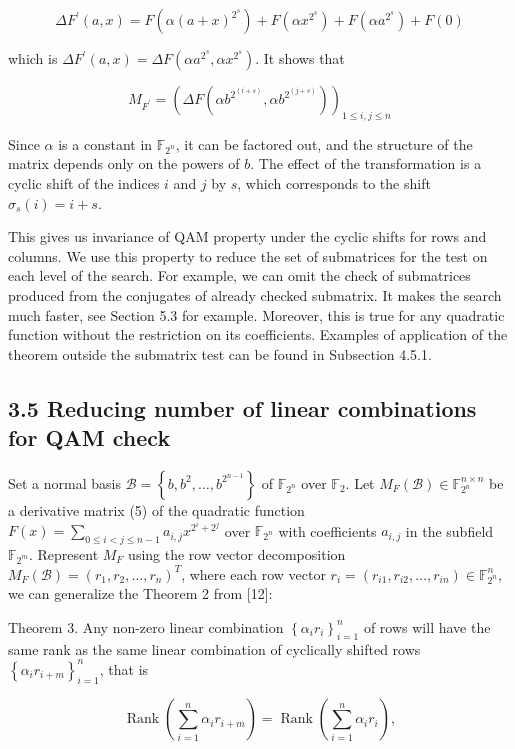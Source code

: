 \documentclass[10pt]{article}
\begin{document}
$$
\Delta F^{\prime}(a, x)=F\left(\alpha(a+x)^{2^{s}}\right)+F\left(\alpha x^{2^{s}}\right)+F\left(\alpha a^{2^{s}}\right)+F(0)
$$

which is $\Delta F^{\prime}(a, x)=\Delta F\left(\alpha a^{2^{s}}, \alpha x^{2^{s}}\right)$. It shows that

$$
M_{F^{\prime}}=\left(\Delta F\left(\alpha b^{2^{(i+s)}}, \alpha b^{2^{(j+s)}}\right)\right)_{1 \leq i, j \leq n}
$$

Since $\alpha$ is a constant in $\mathbb{F}_{2^{n}}$, it can be factored out, and the structure of the matrix depends only on the powers of $b$. The effect of the transformation is a cyclic shift of the indices $i$ and $j$ by $s$, which corresponds to the shift $\sigma_{s}(i)=i+s$.

This gives us invariance of QAM property under the cyclic shifts for rows and columns. We use this property to reduce the set of submatrices for the test on each level of the search. For example, we can omit the check of submatrices produced from the conjugates of already checked submatrix. It makes the search much faster, see Section 5.3 for example. Moreover, this is true for any quadratic function without the restriction on its coefficients. Examples of application of the theorem outside the submatrix test can be found in Subsection 4.5.1.

\subsection*{3.5 Reducing number of linear combinations for QAM check}
Set a normal basis $\mathcal{B}=\left\{b, b^{2}, \ldots, b^{2^{n-1}}\right\}$ of $\mathbb{F}_{2^{n}}$ over $\mathbb{F}_{2}$. Let $M_{F}(\mathcal{B}) \in \mathbb{F}_{2^{n}}^{n \times n}$ be a derivative matrix (5) of the quadratic function $F(x)=\sum_{0 \leq i<j \leq n-1} a_{i, j} x^{2^{i}+2^{j}}$ over $\mathbb{F}_{2^{n}}$ with coefficients $a_{i, j}$ in the subfield $\mathbb{F}_{2^{m}}$. Represent $M_{F}$ using the row vector decomposition $M_{F}(\mathcal{B})=\left(r_{1}, r_{2}, \ldots, r_{n}\right)^{T}$, where each row vector $r_{i}=\left(r_{i 1}, r_{i 2}, \ldots, r_{i n}\right) \in \mathbb{F}_{2^{n}}^{n}$, we can generalize the Theorem 2 from [12]:

Theorem 3. Any non-zero linear combination $\left\{\alpha_{i} r_{i}\right\}_{i=1}^{n}$ of rows will have the same rank as the same linear combination of cyclically shifted rows $\left\{\alpha_{i} r_{i+m}\right\}_{i=1}^{n}$, that is

$$
\operatorname{Rank}\left(\sum_{i=1}^{n} \alpha_{i} r_{i+m}\right)=\operatorname{Rank}\left(\sum_{i=1}^{n} \alpha_{i} r_{i}\right),
$$
\end{document}
